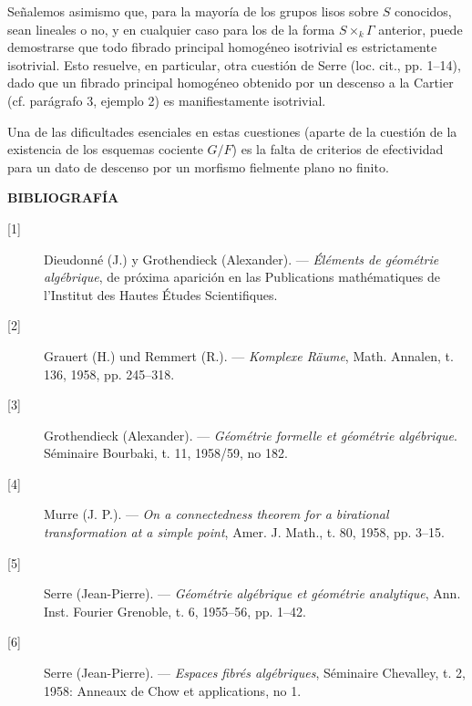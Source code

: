 Señalemos asimismo que, para la mayoría de los grupos lisos sobre $S$ conocidos,
sean lineales o no, y en cualquier caso para los de la forma
$S\times_k\Gamma$ anterior, puede demostrarse que todo fibrado principal
homogéneo isotrivial es estrictamente isotrivial. Esto resuelve, en particular,
otra cuestión de Serre (loc. cit., pp. 1--14), dado que un fibrado principal
homogéneo obtenido por un descenso a la Cartier (cf. parágrafo 3, ejemplo 2) es
manifiestamente isotrivial.

 Una de las dificultades esenciales en estas cuestiones
(aparte de la cuestión de la existencia de los esquemas cociente $G/F$) es la
falta de criterios de efectividad para un dato de descenso por un morfismo
fielmente plano no finito.

\begin{center}
  \textbf{BIBLIOGRAFÍA}
\end{center}

\begin{description}
  \item[{[1]}] Dieudonné (J.) y Grothendieck (Alexander). --- \emph{Éléments
    de géométrie algébrique}, de próxima aparición en las Publications
    mathématiques de l'Institut des Hautes Études Scientifiques.
  \item[{[2]}] Grauert (H.) und Remmert (R.). --- \emph{Komplexe Räume}, Math.
    Annalen, t. 136, 1958, pp. 245--318.
  \item[{[3]}] Grothendieck (Alexander). --- \emph{Géométrie formelle et
    géométrie algébrique}. Séminaire Bourbaki, t. 11, 1958/59, no 182.
  \item[{[4]}] Murre (J. P.). --- \emph{On a connectedness theorem for a
    birational transformation at a simple point}, Amer. J. Math., t. 80, 1958,
    pp. 3--15.
  \item[{[5]}] Serre (Jean-Pierre). --- \emph{Géométrie algébrique et géométrie
    analytique}, Ann. Inst. Fourier Grenoble, t. 6, 1955--56, pp. 1--42.
  \item[{[6]}] Serre (Jean-Pierre). --- \emph{Espaces fibrés algébriques},
    Séminaire Chevalley, t. 2, 1958: Anneaux de Chow et applications, no 1.
\end{description}
